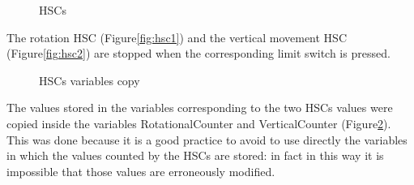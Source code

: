 \begin{figure}[!h]
\centering
{}
\qquad
{}
\caption{HSCs}
\label{fig:HSC}
\end{figure}

The rotation HSC (Figure\ref{fig:hsc1}) and the vertical movement HSC (Figure\ref{fig:hsc2}) are stopped when the corresponding limit switch is pressed.

\begin{figure}[!h]
\centering
{}
\qquad
{}
\caption{HSCs variables copy}
\label{fig:encoder_copy}
\end{figure}

The values stored in the variables corresponding to the two HSCs values were copied inside the variables RotationalCounter and VerticalCounter (Figure\ref{fig:encoder_copy}). This was done because it is a good practice to avoid to use directly the variables in which the values counted by the HSCs are stored: in fact in this way it is impossible that those values are erroneously modified.

